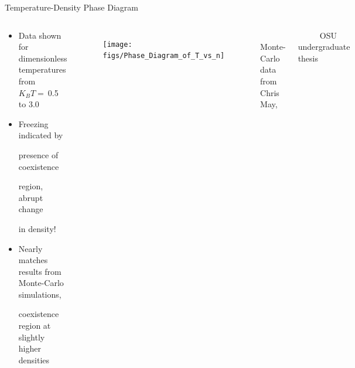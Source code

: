 \documentclass{beamer}
\begin{document}
\begin{frame}{Temperature-Density Phase Diagram}
\begin{columns}
	    \vspace{-2em}
        \begin{block}{}
            \begin{itemize}
              \item Data shown for dimensionless temperatures from $K_BT=~$0.5 to 3.0
              \item Freezing indicated by 
            
               presence of coexistence
            
               region, abrupt change 
            
               in density!
              \item Nearly matches results from Monte-Carlo simulations, 
              
              coexistence region at slightly higher densities
            \end{itemize}
            \end{block}
    \begin{figure}
        \centering
        \texttt{[image: figs/Phase\_Diagram\_of\_T\_vs\_n]}\\
    \end{figure}        
    \vspace{-1em}
    \footnotesize $~~~~~~~~~~~~$Monte-Carlo data from Chris May, 
    
     $~~~~~~~~~~~~$OSU undergraduate thesis
     \normalsize
     \end{columns}
\end{frame}
\end{document}
